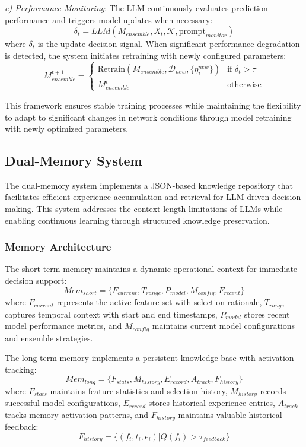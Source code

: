 \documentclass[conference]{IEEEtran}
\begin{document}
\textit{c) Performance Monitoring}: The LLM continuously evaluates prediction performance and triggers model updates when necessary:
\begin{equation}
    \delta_t = LLM(M_{ensemble}, X_t, \mathcal{K}, \text{prompt}_{monitor})
\end{equation}
where $\delta_t$ is the update decision signal. When significant performance degradation is detected, the system initiates retraining with newly configured parameters:
\begin{equation}
    M_{ensemble}^{t+1} = \begin{cases}
        \text{Retrain}(M_{ensemble}, \mathcal{D}_{new}, \{\eta_i^{new}\}) & \text{if } \delta_t > \tau \\
        M_{ensemble}^t & \text{otherwise}
    \end{cases}
\end{equation}

This framework ensures stable training processes while maintaining the flexibility to adapt to significant changes in network conditions through model retraining with newly optimized parameters.

\subsection{Dual-Memory System}
The dual-memory system implements a JSON-based knowledge repository that facilitates efficient experience accumulation and retrieval for LLM-driven decision making. This system addresses the context length limitations of LLMs while enabling continuous learning through structured knowledge preservation.

\subsubsection{Memory Architecture}
The short-term memory maintains a dynamic operational context for immediate decision support:
\begin{equation}
    Mem_{short} = \{F_{current}, T_{range}, P_{model}, M_{config}, F_{recent}\}
\end{equation}
where $F_{current}$ represents the active feature set with selection rationale, $T_{range}$ captures temporal context with start and end timestamps, $P_{model}$ stores recent model performance metrics, and $M_{config}$ maintains current model configurations and ensemble strategies.

The long-term memory implements a persistent knowledge base with activation tracking:
\begin{equation}
    Mem_{long} = \{F_{stats}, M_{history}, E_{record}, A_{track}, F_{history}\}
\end{equation}
where $F_{stats}$ maintains feature statistics and selection history, $M_{history}$ records successful model configurations, $E_{record}$ stores historical experience entries, $A_{track}$ tracks memory activation patterns, and $F_{history}$ maintains valuable historical feedback:
\begin{equation}
    F_{history} = \{(f_i, t_i, e_i) | Q(f_i) > \tau_{feedback}\}
\end{equation}
\end{document}
